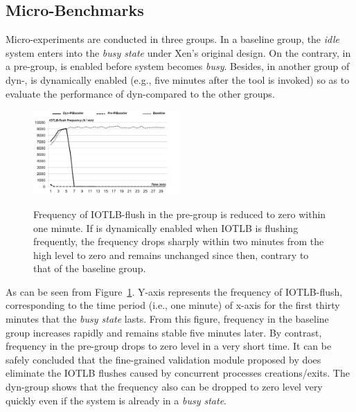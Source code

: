 
\subsection{Micro-Benchmarks}

Micro-experiments are conducted in three groups. In a baseline group, the \emph{idle} system enters into the \emph{busy state} under Xen's original design. On the contrary, in a pre-\name group, \name is enabled before system becomes \emph{busy}. Besides, in another group of dyn-\name, \name is dynamically enabled (e.g., five minutes after the tool is invoked) so as to evaluate the performance of dyn-\name compared to the other groups.

\begin{figure}[ht]
\centering
\includegraphics[width=0.5\textwidth]{image/micro/iotlbflush.jpg} \\
\caption{Frequency of IOTLB-flush in the pre-\name group is reduced to zero within one minute. If \name is dynamically enabled when IOTLB is flushing frequently, the frequency drops sharply within two minutes from the high level to zero and remains unchanged since then, contrary to that of the baseline group.}
\label{fig:iotlbflush}
\end{figure}

As can be seen from Figure~\ref{fig:iotlbflush}. Y-axis represents the frequency of IOTLB-flush, corresponding to the time period (i.e., one minute) of x-axis for the first thirty minutes that the \emph{busy state} lasts. From this figure, frequency in the baseline group increases rapidly and remains stable five minutes later. By contrast, frequency in the pre-\name group drops to zero level in a very short time. It can be safely concluded that the fine-grained validation module proposed by \name does eliminate the IOTLB flushes caused by concurrent processes creations/exits. The dyn-\name group shows that the frequency also can be dropped to zero level very quickly even if the system is already in a \emph{busy state}.

